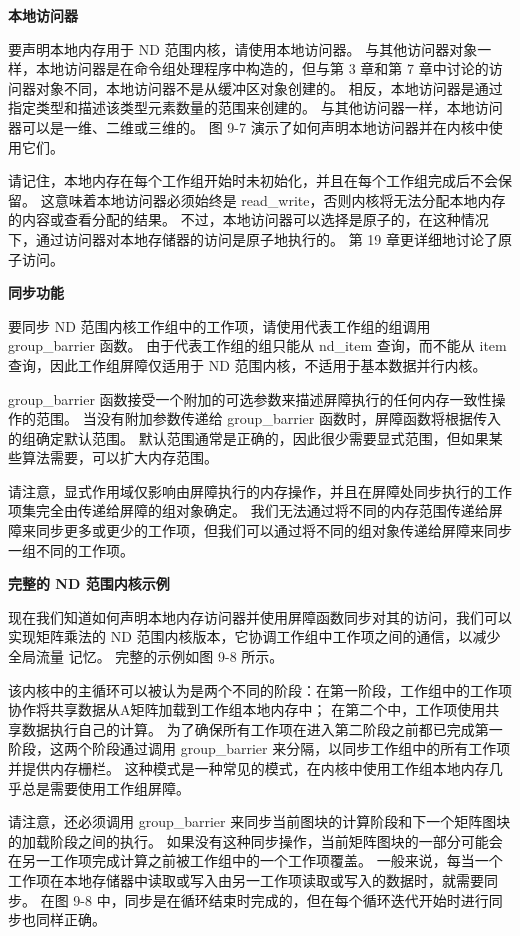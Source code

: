 \textbf{本地访问器}

要声明本地内存用于 ND 范围内核，请使用本地访问器。 与其他访问器对象一样，本地访问器是在命令组处理程序中构造的，但与第 3 章和第 7 章中讨论的访问器对象不同，本地访问器不是从缓冲区对象创建的。 相反，本地访问器是通过指定类型和描述该类型元素数量的范围来创建的。 与其他访问器一样，本地访问器可以是一维、二维或三维的。 图 9-7 演示了如何声明本地访问器并在内核中使用它们。

请记住，本地内存在每个工作组开始时未初始化，并且在每个工作组完成后不会保留。 这意味着本地访问器必须始终是 read\_write，否则内核将无法分配本地内存的内容或查看分配的结果。 不过，本地访问器可以选择是原子的，在这种情况下，通过访问器对本地存储器的访问是原子地执行的。 第 19 章更详细地讨论了原子访问。

\textbf{同步功能}

要同步 ND 范围内核工作组中的工作项，请使用代表工作组的组调用 group\_barrier 函数。 由于代表工作组的组只能从 nd\_item 查询，而不能从 item 查询，因此工作组屏障仅适用于 ND 范围内核，不适用于基本数据并行内核。

group\_barrier 函数接受一个附加的可选参数来描述屏障执行的任何内存一致性操作的范围。 当没有附加参数传递给 group\_barrier 函数时，屏障函数将根据传入的组确定默认范围。 默认范围通常是正确的，因此很少需要显式范围，但如果某些算法需要，可以扩大内存范围。

请注意，显式作用域仅影响由屏障执行的内存操作，并且在屏障处同步执行的工作项集完全由传递给屏障的组对象确定。 我们无法通过将不同的内存范围传递给屏障来同步更多或更少的工作项，但我们可以通过将不同的组对象传递给屏障来同步一组不同的工作项。

\textbf{完整的 ND 范围内核示例}

现在我们知道如何声明本地内存访问器并使用屏障函数同步对其的访问，我们可以实现矩阵乘法的 ND 范围内核版本，它协调工作组中工作项之间的通信，以减少全局流量 记忆。 完整的示例如图 9-8 所示。

该内核中的主循环可以被认为是两个不同的阶段：在第一阶段，工作组中的工作项协作将共享数据从A矩阵加载到工作组本地内存中； 在第二个中，工作项使用共享数据执行自己的计算。 为了确保所有工作项在进入第二阶段之前都已完成第一阶段，这两个阶段通过调用 group\_barrier 来分隔，以同步工作组中的所有工作项并提供内存栅栏。 这种模式是一种常见的模式，在内核中使用工作组本地内存几乎总是需要使用工作组屏障。

请注意，还必须调用 group\_barrier 来同步当前图块的计算阶段和下一个矩阵图块的加载阶段之间的执行。 如果没有这种同步操作，当前矩阵图块的一部分可能会在另一工作项完成计算之前被工作组中的一个工作项覆盖。 一般来说，每当一个工作项在本地存储器中读取或写入由另一工作项读取或写入的数据时，就需要同步。 在图 9-8 中，同步是在循环结束时完成的，但在每个循环迭代开始时进行同步也同样正确。

